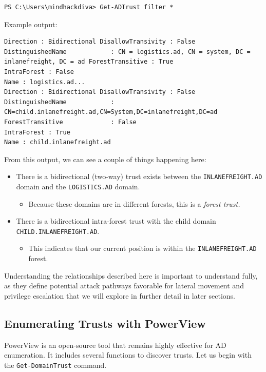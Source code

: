 \begin{notebox}
\begin{verbatim}
PS C:\Users\mindhackdiva> Get-ADTrust filter *
\end{verbatim}
\end{notebox}

Example output:
\begin{notebox}
\begin{verbatim}
Direction : Bidirectional DisallowTransivity : False
DistinguishedName            : CN = logistics.ad, CN = system, DC = inlanefreight, DC = ad ForestTransitive : True
IntraForest : False
Name : logistics.ad...
Direction : Bidirectional DisallowTransivity : False
DistinguishedName            : CN=child.inlanefreight.ad,CN=System,DC=inlanefreight,DC=ad
ForestTransitive             : False
IntraForest : True
Name : child.inlanefreight.ad
\end{verbatim}
\end{notebox}

From this output, we can see a couple of things happening here:
\begin{itemize}
    \item There is a bidirectional (two-way) trust exists between the \texttt{INLANEFREIGHT.AD} domain and the \texttt{LOGISTICS.AD} domain.
    \begin{itemize}
        \item Because these domains are in different forests, this is a \textit{forest trust.}
    \end{itemize}
\item There is a bidirectional intra-forest trust with the child domain \texttt{CHILD.INLANEFREIGHT.AD}.
\begin{itemize}
    \item This indicates that our current position is within the \texttt{INLANEFREIGHT.AD} forest.

\end{itemize}
\end{itemize}

Understanding the relationships described here is important to understand fully, as they define potential attack pathways favorable for lateral movement and privilege escalation that we will explore in further detail in later sections.

\subsection{Enumerating Trusts with PowerView}
PowerView is an open-source tool that remains highly effective for AD enumeration. It includes several functions to discover trusts. Let us begin with the \texttt{Get-DomainTrust} command.

